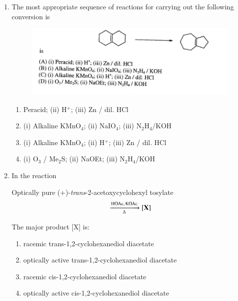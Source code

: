 \documentclass[journal,12pt,onecolumn]{IEEEtran}
\theoremstyle{remark}
\begin{document}
\begin{enumerate}
\item    \hspace{0.5cm} The most appropriate sequence of reactions for carrying out the following conversion is  \hfill{}

\begin{figure}[H]
    \centering
    \includegraphics[width=\textwidth]{figs/image7.jpg}
    \caption{}
    \label{fig:figure7}
\end{figure}

\begin{multicols}{2}
\begin{enumerate}
    \item Peracid; (ii) H$^+$; (iii) Zn / dil. HCl
    \item (i) Alkaline KMnO$_4$; (ii) NaIO$_4$; (iii) N$_2$H$_4$/KOH
    \item (i) Alkaline KMnO$_4$; (ii) H$^+$; (iii) Zn / dil. HCl
    \item (i) O$_3$ / Me$_2$S; (ii) NaOEt; (iii) N$_2$H$_4$/KOH
\end{enumerate}
\end{multicols}




 

\item    \hspace{0.5cm} In the reaction  \hfill{}

\begin{center}
\noindent Optically pure (+)-\textit{trans}-2-acetoxycyclohexyl tosylate
\[
\ce{->[\ce{HOAc}, \ce{KOAc}][\Delta]}[\textbf{X}]
\]
\end{center}

The major product [X] is:

\begin{multicols}{2}
\begin{enumerate}
    \item racemic trans-1,2-cyclohexanediol diacetate
    \item optically active trans-1,2-cyclohexanediol diacetate
    \item racemic cis-1,2-cyclohexanediol diacetate
    \item optically active cis-1,2-cyclohexanediol diacetate
\end{enumerate}
\end{multicols}


\end{enumerate}
\end{document}
